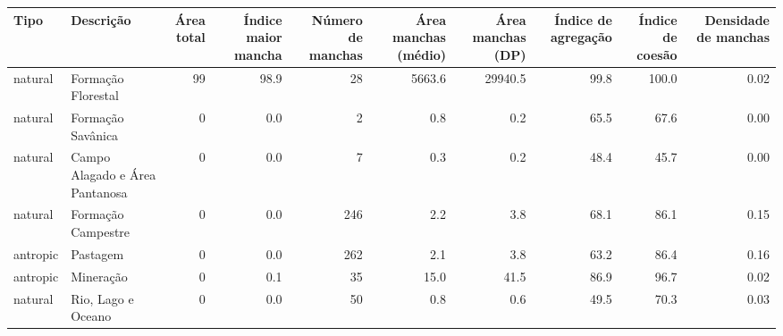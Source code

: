 \documentclass[border=1mm, preview]{standalone}
\begin{document}
\begin{tabular}{l|l|r|r|r|r|r|r|r|r}
\hline
Tipo & Descrição & Área total & Índice maior mancha & Número de manchas & Área manchas (médio) & Área manchas (DP) & Índice de agregação & Índice de coesão & Densidade de manchas\\
\hline
natural & Formação Florestal & 99 & 98.9 & 28 & 5663.6 & 29940.5 & 99.8 & 100.0 & 0.02\\
\hline
natural & Formação Savânica & 0 & 0.0 & 2 & 0.8 & 0.2 & 65.5 & 67.6 & 0.00\\
\hline
natural & Campo Alagado e Área Pantanosa & 0 & 0.0 & 7 & 0.3 & 0.2 & 48.4 & 45.7 & 0.00\\
\hline
natural & Formação Campestre & 0 & 0.0 & 246 & 2.2 & 3.8 & 68.1 & 86.1 & 0.15\\
\hline
antropic & Pastagem & 0 & 0.0 & 262 & 2.1 & 3.8 & 63.2 & 86.4 & 0.16\\
\hline
antropic & Mineração & 0 & 0.1 & 35 & 15.0 & 41.5 & 86.9 & 96.7 & 0.02\\
\hline
natural & Rio, Lago e Oceano & 0 & 0.0 & 50 & 0.8 & 0.6 & 49.5 & 70.3 & 0.03\\
\hline
\end{tabular}
\end{document}
